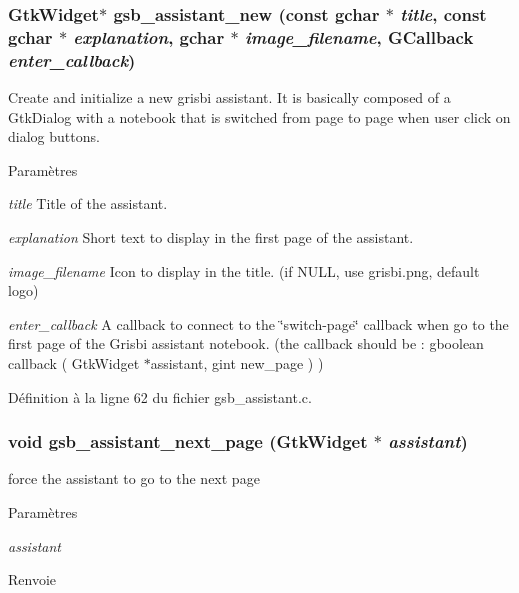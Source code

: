 \subsubsection[{gsb\_\-assistant\_\-new}]{\setlength{\rightskip}{0pt plus 5cm}GtkWidget$\ast$ gsb\_\-assistant\_\-new (const gchar $\ast$ {\em title}, \/  const gchar $\ast$ {\em explanation}, \/  gchar $\ast$ {\em image\_\-filename}, \/  GCallback {\em enter\_\-callback})}\label{gsb__assistant_8h_a8502128771d8c3f3e8c83d877e1f20ea}
Create and initialize a new grisbi assistant. It is basically composed of a GtkDialog with a notebook that is switched from page to page when user click on dialog buttons.


\begin{DoxyParams}{Paramètres}
\item[{\em title}]Title of the assistant. \item[{\em explanation}]Short text to display in the first page of the assistant. \item[{\em image\_\-filename}]Icon to display in the title. (if NULL, use grisbi.png, default logo) \item[{\em enter\_\-callback}]A callback to connect to the \char`\"{}switch-\/page\char`\"{} callback when go to the first page of the Grisbi assistant notebook. (the callback should be : gboolean callback ( GtkWidget $\ast$assistant, gint new\_\-page ) ) \end{DoxyParams}


Définition à la ligne 62 du fichier gsb\_\-assistant.c.

\subsubsection[{gsb\_\-assistant\_\-next\_\-page}]{\setlength{\rightskip}{0pt plus 5cm}void gsb\_\-assistant\_\-next\_\-page (GtkWidget $\ast$ {\em assistant})}\label{gsb__assistant_8h_afa94b439f0978b7eac4d469df5def613}
force the assistant to go to the next page


\begin{DoxyParams}{Paramètres}
\item[{\em assistant}]\end{DoxyParams}
\begin{DoxyReturn}{Renvoie}

\end{DoxyReturn}


